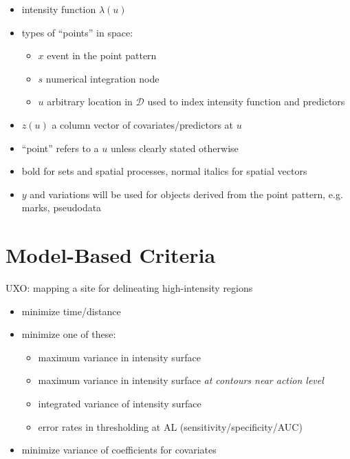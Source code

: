 \documentclass[12pt]{article}
\begin{document}
\begin{itemize}
\item intensity function \(\lambda(u)\)

\item types of ``points'' in space:
\begin{itemize}
\item \(x\) event in the point pattern
\item \(s\) numerical integration node
\item \(u\) arbitrary location in \(\mathcal{D}\) used to index intensity
function and predictors
\end{itemize}

\item \(z(u)\) a column vector of covariates/predictors at \(u\)

\item ``point'' refers to a \(u\) unless clearly stated otherwise

\item bold for sets and spatial processes, normal italics for spatial vectors

\item \(y\) and variations will be used for objects derived from the point
pattern, e.g. marks, pseudodata

\end{itemize}


\section{Model-Based Criteria}

UXO: mapping a site for delineating high-intensity regions
\begin{itemize}
\item minimize time/distance
\item minimize one of these:
\begin{itemize}
\item maximum variance in intensity surface
\item maximum variance in intensity surface \emph{at contours near action level}
\item integrated variance of intensity surface
\item error rates in thresholding at AL (sensitivity/specificity/AUC)
\end{itemize}
\item minimize variance of coefficients for covariates
\end{itemize}
\end{document}
